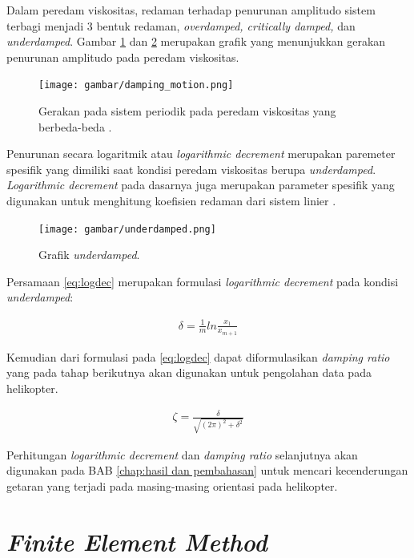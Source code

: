 Dalam peredam viskositas, redaman terhadap penurunan amplitudo sistem terbagi menjadi 3 bentuk redaman, \textit{overdamped, critically damped,} dan \textit{underdamped}. Gambar \ref{fig:damping_motion} dan \ref{fig:underdamped} merupakan grafik yang menunjukkan gerakan penurunan amplitudo pada peredam viskositas. 

\begin{figure}[H]
	\centering
	\texttt{[image: gambar/damping\_motion.png]}
	\caption{Gerakan pada sistem periodik pada peredam viskositas yang berbeda-beda \cite{rao2004mechanical}.}
	\label{fig:damping_motion}
\end{figure}

Penurunan secara logaritmik atau \textit{logarithmic decrement} merupakan paremeter spesifik yang dimiliki saat kondisi peredam viskositas berupa \textit{underdamped}. \textit{Logarithmic decrement} pada dasarnya juga merupakan parameter spesifik yang digunakan untuk menghitung koefisien redaman dari sistem linier \cite{Lojewski2020InfluenceOC}. 

\begin{figure}[H]
	\centering
	\texttt{[image: gambar/underdamped.png]}
	\caption{Grafik \textit{underdamped}.}
	\label{fig:underdamped}
\end{figure}

Persamaan \ref{eq:logdec} merupakan formulasi \textit{logarithmic decrement} pada kondisi \textit{underdamped}:

\begin{align}
	\delta = \frac{1}{m}ln\frac{x_1}{x_{m+1}}
	\label{eq:logdec}
\end{align}

Kemudian dari formulasi pada \ref{eq:logdec} dapat diformulasikan \textit{damping ratio} yang pada tahap berikutnya akan digunakan untuk pengolahan data pada helikopter.

\begin{align}
	\zeta=\frac{\delta}{\sqrt{\left( 2\pi \right)^2+\delta^2}}
\end{align}

Perhitungan \textit{logarithmic decrement} dan \textit{damping ratio} selanjutnya akan digunakan pada BAB \ref{chap:hasil dan pembahasan} untuk mencari kecenderungan getaran yang terjadi pada masing-masing orientasi pada helikopter.

\section{\textit{Finite Element Method}}
\label{FEM}

